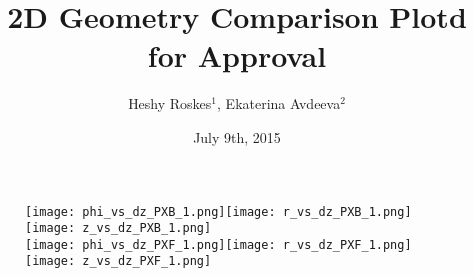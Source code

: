 \documentclass{beamer}
\title{2D Geometry Comparison Plotd for Approval}
\author{Heshy Roskes$^1$, Ekaterina Avdeeva$^2$}
\institute{$^1$Johns Hopkins University, $^2$University of Nebraska - Lincoln}
\date{July 9th, 2015}
\begin{document}
\begin{frame}
\titlepage
\end{frame}


\begin{frame}%
  \begin{figure}
    \centering
    \texttt{[image: phi\_vs\_dz\_PXB\_1.png]}\texttt{[image: r\_vs\_dz\_PXB\_1.png]}\texttt{[image: z\_vs\_dz\_PXB\_1.png]}\\
\texttt{[image: phi\_vs\_dz\_PXF\_1.png]}\texttt{[image: r\_vs\_dz\_PXF\_1.png]}\texttt{[image: z\_vs\_dz\_PXF\_1.png]}
  \end{figure}
\end{frame}
\end{document}
